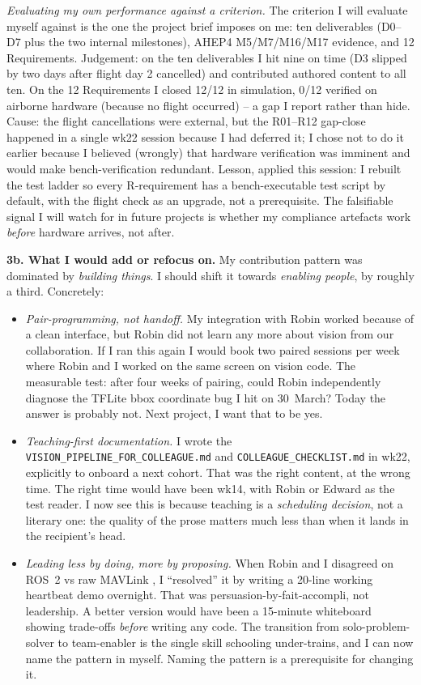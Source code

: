 \textit{Evaluating my own performance against a criterion.}  The criterion I will evaluate myself against is the one the project brief imposes on me: ten deliverables (D0--D7 plus the two internal milestones), AHEP4 M5/M7/M16/M17 evidence, and 12 Requirements. Judgement: on the ten deliverables I hit nine on time (D3 slipped by two days after flight day 2 cancelled) and contributed authored content to all ten. On the 12 Requirements I closed 12/12 in simulation, 0/12 verified on airborne hardware (because no flight occurred) -- a gap I report rather than hide. Cause: the flight cancellations were external, but the R01--R12 gap-close happened in a single wk22 session because I had deferred it; I chose not to do it earlier because I believed (wrongly) that hardware verification was imminent and would make bench-verification redundant. Lesson, applied this session: I rebuilt the test ladder so every R-requirement has a bench-executable test script by default, with the flight check as an upgrade, not a prerequisite. The falsifiable signal I will watch for in future projects is whether my compliance artefacts work \textit{before} hardware arrives, not after.

\textbf{3b. What I would add or refocus on.}  My contribution pattern was dominated by \textit{building things}. I should shift it towards \textit{enabling people}, by roughly a third. Concretely:

\begin{itemize}
\item \textit{Pair-programming, not handoff.} My integration with Robin worked because of a clean interface, but Robin did not learn any more about vision from our collaboration. If I ran this again I would book two paired sessions per week where Robin and I worked on the same screen on vision code. The measurable test: after four weeks of pairing, could Robin independently diagnose the TFLite bbox coordinate bug I hit on 30~March? Today the answer is probably not. Next project, I want that to be yes.
\item \textit{Teaching-first documentation.} I wrote the \texttt{VISION\_PIPELINE\_FOR\_COLLEAGUE.md} and \texttt{COLLEAGUE\_CHECKLIST.md} in wk22, explicitly to onboard a next cohort. That was the right content, at the wrong time. The right time would have been wk14, with Robin or Edward as the test reader. I now see this is because teaching is a \textit{scheduling decision}, not a literary one: the quality of the prose matters much less than when it lands in the recipient's head.
\item \textit{Leading less by doing, more by proposing.} When Robin and I disagreed on ROS~2 vs raw MAVLink , I ``resolved'' it by writing a 20-line working heartbeat demo overnight. That was persuasion-by-fait-accompli, not leadership. A better version would have been a 15-minute whiteboard showing trade-offs \textit{before} writing any code. The transition from solo-problem-solver to team-enabler is the single skill schooling under-trains, and I can now name the pattern in myself. Naming the pattern is a prerequisite for changing it.
\end{itemize}

